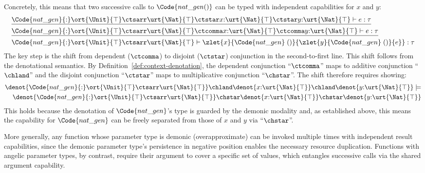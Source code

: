 Concretely, this means that two successive calls to $\Code{nat\_gen()}$
can be typed with independent capabilities for $x$ and $y$:
\begin{align*}
  &\underline{\Code{nat\_gen}{:}\ort{\Unit}{\top} \ctsarr \urt{\Nat}{\top}
    \ctstar x{:}\urt{\Nat}{\top} \ctstar y{:}\urt{\Nat}{\top}
    \vdash e : \tau}
  \\&\underline{\Code{nat\_gen}{:}\ort{\Unit}{\top} \ctsarr \urt{\Nat}{\top}
    \ctcomma x{:}\urt{\Nat}{\top} \ctcomma y{:}\urt{\Nat}{\top}
    \vdash e : \tau}
  \\&\Code{nat\_gen}{:}\ort{\Unit}{\top} \ctsarr \urt{\Nat}{\top}
    \vdash \zlet{x}{\Code{nat\_gen}\;()}{\zlet{y}{\Code{nat\_gen}\;()}{e}} : \tau
\end{align*}
The key step is the shift from dependent ($\ctcomma$) to disjoint
($\ctstar$) conjunction in the second-to-first line.  This shift
follows from the denotational semantics. By
Definition~\ref{def:context-denotation}, the dependent conjunction
``$\ctcomma$'' maps to additive conjunction ``$\chland$''
and the disjoint conjunction ``$\ctstar$'' maps to
multiplicative conjunction ``$\chstar$''. The shift therefore
requires showing:
\begin{align*}
  \denot{\Code{nat\_gen}{:}\ort{\Unit}{\top} \ctsarr \urt{\Nat}{\top}} \chland \denot{x{:}\urt{\Nat}{\top}} \chland \denot{y{:}\urt{\Nat}{\top}} \models\\
  \denot{\Code{nat\_gen}{:}\ort{\Unit}{\top} \ctsarr \urt{\Nat}{\top}} \chstar \denot{x{:}\urt{\Nat}{\top}} \chstar \denot{y{:}\urt{\Nat}{\top}}
\end{align*}  
This holds because the denotation of $\Code{nat\_gen}$'s type is
guarded by the demonic modality and, as established above, this means
the capability for $\Code{nat\_gen}$ can be freely separated from
those of $x$ and $y$ via ``$\chstar$''.

More generally, any function whose parameter type is demonic
(overapproximate) can be invoked multiple times with independent result
capabilities, since the demonic parameter type's persistence in negative
position enables the necessary resource duplication.  Functions with
angelic parameter types, by contrast, require their argument to cover
a specific set of values, which entangles successive calls via the
shared argument capability.

